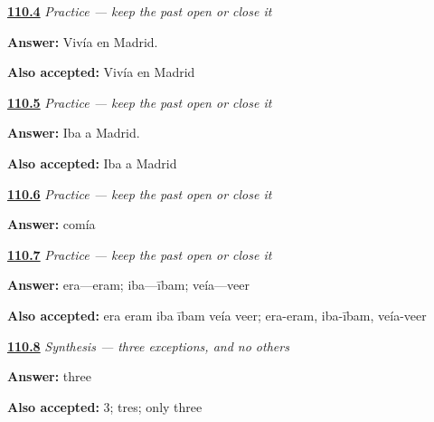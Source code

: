 \noindent\begin{minipage}[t]{\linewidth}
\raggedright
\hyperlink{review-ES-C16-practice-vivia-madrid}{\textbf{110.4}} \emph{Practice — keep the past open or close it}\par
\small \textbf{Answer:} Vivía en Madrid.\par
\footnotesize \textbf{Also accepted:} Vivía en Madrid
\end{minipage}\par\medskip

\noindent\begin{minipage}[t]{\linewidth}
\raggedright
\hyperlink{review-ES-C16-practice-iba-madrid}{\textbf{110.5}} \emph{Practice — keep the past open or close it}\par
\small \textbf{Answer:} Iba a Madrid.\par
\footnotesize \textbf{Also accepted:} Iba a Madrid
\end{minipage}\par\medskip

\noindent\begin{minipage}[t]{\linewidth}
\raggedright
\hyperlink{review-ES-C16-practice-comi-comia}{\textbf{110.6}} \emph{Practice — keep the past open or close it}\par
\small \textbf{Answer:} comía\par
\end{minipage}\par\medskip

\noindent\begin{minipage}[t]{\linewidth}
\raggedright
\hyperlink{review-ES-C16-practice-history-match}{\textbf{110.7}} \emph{Practice — keep the past open or close it}\par
\small \textbf{Answer:} era—eram; iba—ībam; veía—veer\par
\footnotesize \textbf{Also accepted:} era eram iba ībam veía veer; era-eram, iba-ībam, veía-veer
\end{minipage}\par\medskip

\noindent\begin{minipage}[t]{\linewidth}
\raggedright
\hyperlink{review-ES-C16-sintesis-imperfecto-count}{\textbf{110.8}} \emph{Synthesis — three exceptions, and no others}\par
\small \textbf{Answer:} three\par
\footnotesize \textbf{Also accepted:} 3; tres; only three
\end{minipage}\par\medskip

